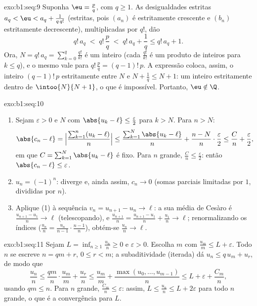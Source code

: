 \begin{solution}{exo:b1:seq:9}
Suponha $\eu = \frac pq$, com $q \geq 1$. As desigualdades estritas $a_q <
\eu < a_q + \frac{1}{q\,q!}$ (estritas, pois $(a_n)$ é estritamente
crescente e $(b_n)$ estritamente decrescente), multiplicadas por $q!$, dão
\[
q!\,a_q \;<\; q!\,\frac pq \;<\; q!\,a_q + \frac 1q \leq q!\,a_q + 1.
\]
Ora, $N = q!\,a_q = \sum_{k=0}^{q} \frac{q!}{k!}$ é um inteiro (cada
$\frac{q!}{k!}$ é um produto de inteiros para $k \leq q$), e o mesmo vale para
$q!\,\frac pq = (q-1)!\,p$. A expressão coloca, assim, o inteiro
$(q-1)!\,p$ estritamente entre $N$ e $N + \frac 1q \leq N + 1$: um
inteiro estritamente dentro de $\intoo{N}{N+1}$, o que é impossível. Portanto,
$\eu \notin \Q$.
\end{solution}

\begin{solution}{exo:b1:seq:10}
\begin{enumerate}
  \item Sejam $\varepsilon > 0$ e $N$ com $\abs{u_k - \ell} \leq
        \frac{\varepsilon}{2}$ para $k > N$. Para $n > N$:
        \[
        \abs{c_n - \ell}
        = \Bigl|\frac{\sum_{k=1}^{n}(u_k - \ell)}{n}\Bigr|
        \leq \frac{\sum_{k=1}^{N} \abs{u_k - \ell}}{n}
        + \frac{n - N}{n}\cdot\frac{\varepsilon}{2}
        \leq \frac{C}{n} + \frac{\varepsilon}{2},
        \]
        em que $C = \sum_{k=1}^N \abs{u_k - \ell}$ é fixo. Para $n$
        grande, $\frac Cn \leq \frac\varepsilon2$: então $\abs{c_n -
        \ell} \leq \varepsilon$.
  \item $u_n = (-1)^n$: diverge e, ainda assim, $c_n \to 0$ (somas parciais
        limitadas por $1$, divididas por $n$).
  \item Aplique (1) à sequência $v_n = u_{n+1} - u_n \to \ell$: a sua
        média de Cesàro é $\frac{u_{n+1} - u_1}{n} \to \ell$
        (telescopando), e $\frac{u_{n+1}}{n} = \frac{u_{n+1} -
        u_1}{n} + \frac{u_1}{n} \to \ell$; renormalizando os índices
        ($\frac{u_n}{n} = \frac{u_n}{n-1}\cdot\frac{n-1}{n}$), obtém-se
        $\frac{u_n}{n} \to \ell$.
\end{enumerate}
\end{solution}

\begin{solution}{exo:b1:seq:11}
Sejam $L = \inf_{n \geq 1} \frac{u_n}{n} \geq 0$ e $\varepsilon >
0$. Escolha $m$ com $\frac{u_m}{m} \leq L + \varepsilon$. Todo $n$
se escreve $n = qm + r$, $0 \leq r < m$; a subaditividade (iterada) dá
$u_n \leq q\,u_m + u_r$, de modo que
\[
\frac{u_n}{n} \leq \frac{q m}{n}\cdot\frac{u_m}{m} + \frac{u_r}{n}
\leq \frac{u_m}{m} + \frac{\max(u_0, \dots, u_{m-1})}{n}
\leq L + \varepsilon + \frac{C_m}{n},
\]
usando $qm \leq n$. Para $n$ grande, $\frac{C_m}{n} \leq \varepsilon$:
assim, $L \leq \frac{u_n}{n} \leq L + 2\varepsilon$ para todo $n$ grande,
o que é a convergência para $L$.
\end{solution}

